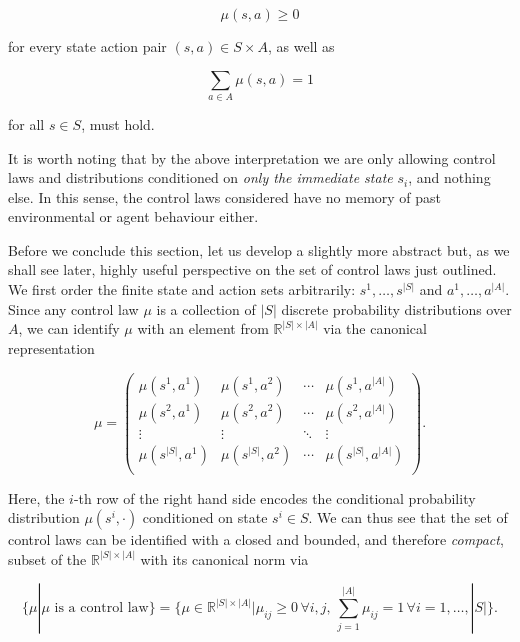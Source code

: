 \documentclass[11pt]{article} %
\begin{document}
\begin{equation}\label{controlProbPositive}
	\mu(s,a) \ge 0
\end{equation}

 for every state action pair $(s,a) \in S \times A$, as well as 

\begin{equation}\label{controlProbSum1}
	\sum_{a \in A} \mu(s,a) = 1
\end{equation}

for all $s \in S$, must hold. 

It is worth noting that by the above interpretation we are only allowing control laws and distributions conditioned on \textit{only the immediate state} $s_i$, and nothing else. In this sense, the control laws considered have no memory of past environmental or agent behaviour either.

Before we conclude this section, let us develop a slightly more abstract but, as we shall see later, highly useful perspective on the set of control laws just outlined. We first order the finite state and action sets arbitrarily: $s^1,\dots,s^{|S|}$ and $a^1,\dots,a^{|A|}$. Since any control law $\mu$ is a collection of $|S|$ discrete probability distributions over $A$, we can identify $\mu$ with an element from $\mathbb{R}^{|S| \times |A|}$ via the canonical representation

\begin{equation}\label{controlProbMatrix}
	\mu = \left(	\begin{array}{cccc}
					\mu(s^1,a^1)	&	\mu(s^1,a^2)	&	\cdots 	&	\mu(s^1,a^{|A|}) \\
					\mu(s^2,a^1)	&	\mu(s^2,a^2)	&	\cdots 	&	\mu(s^2,a^{|A|}) \\
					\vdots 		&	\vdots 		& 	\ddots 	& 	\vdots \\
					\mu(s^{|S|},a^1)	&	\mu(s^{|S|},a^2)	&	\cdots 	&	\mu(s^{|S|},a^{|A|}) \\
				\end{array}
		\right).
\end{equation}

Here, the $i$-th row of the right hand side encodes the conditional probability distribution $\mu(s^i, \cdot)$ conditioned on state $s^i \in S$. We can thus see that the set of control laws can be identified with a closed and bounded, and therefore \textit{compact}, subset of the $\mathbb{R}^{|S| \times |A|}$ with its canonical norm via

\begin{equation}
	\Big\{ \mu | \mu \text{ is a control law} \Big\} = \Big\{ \mu \in \mathbb{R}^{|S| \times |A|} \Big| \mu_{ij} \ge 0 \, \forall i,j, \, \sum_{j=1}^{|A|} \mu_{ij} = 1 \, \forall i=1,\dots,|S| \Big\}.
\end{equation}
\end{document}
